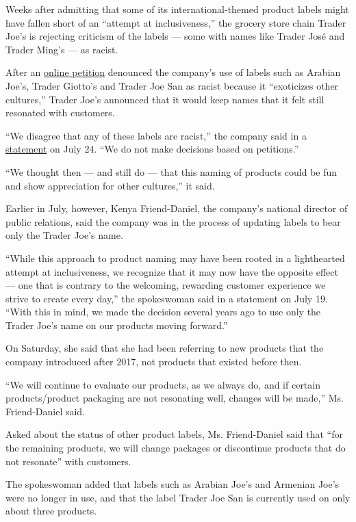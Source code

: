 Weeks after admitting that some of its international-themed product
labels might have fallen short of an ``attempt at inclusiveness,'' the
grocery store chain Trader Joe's is rejecting criticism of the labels
--- some with names like Trader José and Trader Ming's --- as racist.

After an
\href{https://www.nytimes.com/2020/07/19/business/trader-joes-petition.html}{online
petition} denounced the company's use of labels such as Arabian Joe's,
Trader Giotto's and Trader Joe San as racist because it ``exoticizes
other cultures,'' Trader Joe's announced that it would keep names that
it felt still resonated with customers.

``We disagree that any of these labels are racist,'' the company said in
a
\href{https://www.traderjoes.com/announcement/a-note-about-our-product-naming}{statement}
on July 24. ``We do not make decisions based on petitions.''

``We thought then --- and still do --- that this naming of products
could be fun and show appreciation for other cultures,'' it said.

Earlier in July, however, Kenya Friend-Daniel, the company's national
director of public relations, said the company was in the process of
updating labels to bear only the Trader Joe's name.

``While this approach to product naming may have been rooted in a
lighthearted attempt at inclusiveness, we recognize that it may now have
the opposite effect --- one that is contrary to the welcoming, rewarding
customer experience we strive to create every day,'' the spokeswoman
said in a statement on July 19. ``With this in mind, we made the
decision several years ago to use only the Trader Joe's name on our
products moving forward.''

On Saturday, she said that she had been referring to new products that
the company introduced after 2017, not products that existed before
then.

``We will continue to evaluate our products, as we always do, and if
certain products/product packaging are not resonating well, changes will
be made,'' Ms. Friend-Daniel said.

Asked about the status of other product labels, Ms. Friend-Daniel said
that ``for the remaining products, we will change packages or
discontinue products that do not resonate'' with customers.

The spokeswoman added that labels such as Arabian Joe's and Armenian
Joe's were no longer in use, and that the label Trader Joe San is
currently used on only about three products.

